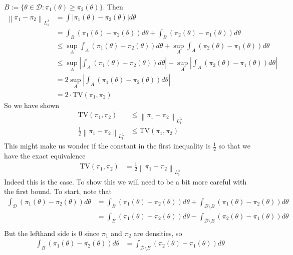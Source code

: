 \documentclass[12pt]{article}
\newcommand*{\norm}[1]{\left\lVert#1\right\rVert}
\newcommand*{\abs}[1]{\left\lvert#1\right\rvert}
\begin{document}
$B := \{\theta \in \mathcal{D}: \pi_1(\theta) \geq \pi_2(\theta)\}$. Then 
\begin{align*}
\norm{\pi_1 - \pi_2}_{L_1^\lambda} &= \int \abs{\pi_1(\theta) - \pi_2(\theta)} d\theta \\
						      &= \int_B \left(\pi_1(\theta) - \pi_2(\theta)\right) d\theta +  \int_B \left(\pi_2(\theta)  - \pi_1(\theta)\right) d\theta \\
						      &\leq \sup_A \int_A \left(\pi_1(\theta) - \pi_2(\theta)\right) d\theta + \sup_A \int_A \left(\pi_2(\theta)  - \pi_1(\theta)\right) d\theta \\
						      &\leq \sup_A \abs{\int_A \left(\pi_1(\theta) - \pi_2(\theta)\right) d\theta} + \sup_A \abs{\int_A \left(\pi_2(\theta)  - \pi_1(\theta)\right) d\theta} \\
						      &= 2 \sup_A \abs{\int_A \left(\pi_1(\theta) - \pi_2(\theta)\right) d\theta} \\
						      &= 2 \cdot \text{TV}(\pi_1, \pi_2)
\end{align*}
So we have shown 
\begin{align*}
\text{TV}(\pi_1, \pi_2) &\leq \norm{\pi_1 - \pi_2}_{L_1^\lambda} \\
\frac{1}{2} \norm{\pi_1 - \pi_2}_{L_1^\lambda} &\leq \text{TV}(\pi_1, \pi_2)
\end{align*}
This might make us wonder if the constant in the first inequality is $\frac{1}{2}$ so that we have the exact equivalence 
\begin{align*}
\text{TV}(\pi_1, \pi_2) &= \frac{1}{2} \norm{\pi_1 - \pi_2}_{L_1^\lambda}
\end{align*}
Indeed this is the case. To show this we will need to be a bit more careful with the first bound. To start, note that 
\begin{align*}
\int_\mathcal{D} \left(\pi_1(\theta) - \pi_2(\theta)\right) d\theta &= \int_B \left(\pi_1(\theta) - \pi_2(\theta)\right) d\theta + \int_{\mathcal{D} \setminus B} \left(\pi_1(\theta) - \pi_2(\theta)\right) d\theta \\
											     &=  \int_B \left(\pi_1(\theta) - \pi_2(\theta)\right) d\theta - \int_{\mathcal{D} \setminus B} \left(\pi_2(\theta) - \pi_1(\theta)\right) d\theta \\
\end{align*}
But the lefthand side is $0$ since $\pi_1$ and $\pi_2$ are densities, so 
\begin{align*}
\int_B \left(\pi_1(\theta) - \pi_2(\theta)\right) d\theta &= \int_{\mathcal{D} \setminus B} \left(\pi_2(\theta) - \pi_1(\theta)\right) d\theta
\end{align*}
\end{document}
